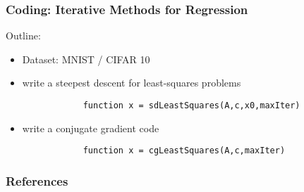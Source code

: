 \documentclass[12pt,fleqn]{beamer}
\begin{document}
\begin{frame}[fragile]
	\frametitle{Coding: Iterative Methods for Regression}
	
	Outline:
	\begin{itemize}
		\item Dataset: MNIST / CIFAR 10
		\item write a steepest descent for least-squares problems
		\begin{verbatim}
			function x = sdLeastSquares(A,c,x0,maxIter)
		\end{verbatim}
		\item write a conjugate gradient code
		\begin{verbatim}
			function x = cgLeastSquares(A,c,maxIter)
		\end{verbatim}
	\end{itemize}
\end{frame}



\begin{frame}[allowframebreaks]
	\frametitle{References}



\end{frame}
\end{document}
